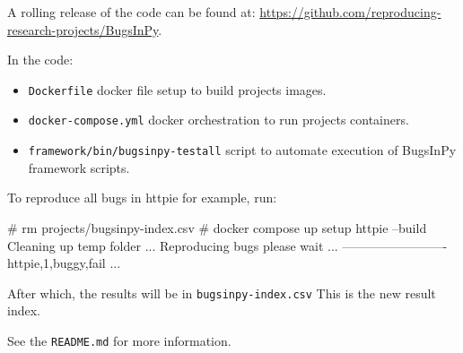\documentclass[conference]{IEEEtran}
\begin{document}

A rolling release of the code can be found at: \url{https://github.com/reproducing-research-projects/BugsInPy}.

In the code:
\begin{itemize}
  \item \texttt{Dockerfile} docker file setup to build projects images.
  \item \texttt{docker-compose.yml} docker orchestration to run projects containers.
  \item \texttt{framework/bin/bugsinpy-testall} script to automate execution of BugsInPy framework scripts.
\end{itemize}

To reproduce all bugs in httpie for example, run: 

\begin{verbatim*}
# rm projects/bugsinpy-index.csv
# docker compose up setup httpie --build
Cleaning up temp folder ...
Reproducing bugs please wait ...
-------------------------
httpie,1,buggy,fail
...
\end{verbatim*}

After which, the results will be in \texttt{bugsinpy-index.csv} This is the new result index.

See the \texttt{README.md} for more information.
\end{document}
